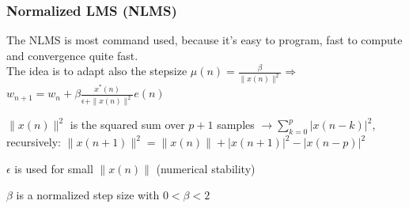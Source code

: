 \subsubsection{Normalized LMS (NLMS) }
The NLMS is most command used, because it's easy to program, fast to compute and convergence quite fast.\\
The idea is to adapt also the stepsize $\mu(n)=\frac{\beta}{\|x(n)\|^2} \Rightarrow $
$\boxed{w_{n+1}=w_n +\beta \frac{x^*(n)}{\epsilon+\|x(n)\|^2}e(n)}$\\
\begin{liste}
	\item $\|x(n)\|^2$ is the squared sum over $p+1$ samples $\to \sum\limits_{k=0}^{p} | x(n-k) |^2 $, recursively: $\|x(n+1)\|^2 =  \|x(n)\| + |x(n+1)|^2 -|x(n-p)|^2$
 	\item $\epsilon$ is used for small $\|x(n)\|$ (numerical stability)
	\item $\beta$ is a normalized step size with $0 < \beta < 2$
\end{liste}


